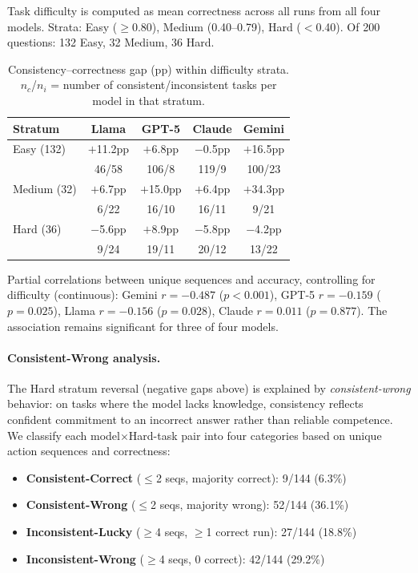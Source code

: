 \documentclass{article}
\begin{document}
Task difficulty is computed as mean correctness across all runs from all four models. Strata: Easy ($\geq$0.80), Medium (0.40--0.79), Hard ($<$0.40). Of 200 questions: 132 Easy, 32 Medium, 36 Hard.

\begin{table}[h]
\centering
\small
\caption{Consistency--correctness gap (pp) within difficulty strata. $n_c$/$n_i$ = number of consistent/inconsistent tasks per model in that stratum.}
\scriptsize
\begin{tabular}{lcccc}
\toprule
\textbf{Stratum} & \textbf{Llama} & \textbf{GPT-5} & \textbf{Claude} & \textbf{Gemini} \\
\midrule
Easy (132) & $+$11.2pp & $+$6.8pp & $-$0.5pp & $+$16.5pp \\
 & {\tiny 46/58} & {\tiny 106/8} & {\tiny 119/9} & {\tiny 100/23} \\
Medium (32) & $+$6.7pp & $+$15.0pp & $+$6.4pp & $+$34.3pp \\
 & {\tiny 6/22} & {\tiny 16/10} & {\tiny 16/11} & {\tiny 9/21} \\
Hard (36) & $-$5.6pp & $+$8.9pp & $-$5.8pp & $-$4.2pp \\
 & {\tiny 9/24} & {\tiny 19/11} & {\tiny 20/12} & {\tiny 13/22} \\
\bottomrule
\end{tabular}
\end{table}

Partial correlations between unique sequences and accuracy, controlling for difficulty (continuous): Gemini $r=-0.487$ ($p<0.001$), GPT-5 $r=-0.159$ ($p=0.025$), Llama $r=-0.156$ ($p=0.028$), Claude $r=0.011$ ($p=0.877$). The association remains significant for three of four models.

\paragraph{Consistent-Wrong analysis.} The Hard stratum reversal (negative gaps above) is explained by \emph{consistent-wrong} behavior: on tasks where the model lacks knowledge, consistency reflects confident commitment to an incorrect answer rather than reliable competence. We classify each model$\times$Hard-task pair into four categories based on unique action sequences and correctness:

\begin{itemize}[nosep,leftmargin=*]
  \item \textbf{Consistent-Correct} ($\leq$2 seqs, majority correct): 9/144 (6.3\%)
  \item \textbf{Consistent-Wrong} ($\leq$2 seqs, majority wrong): 52/144 (36.1\%)
  \item \textbf{Inconsistent-Lucky} ($\geq$4 seqs, $\geq$1 correct run): 27/144 (18.8\%)
  \item \textbf{Inconsistent-Wrong} ($\geq$4 seqs, 0 correct): 42/144 (29.2\%)
\end{itemize}
\end{document}
